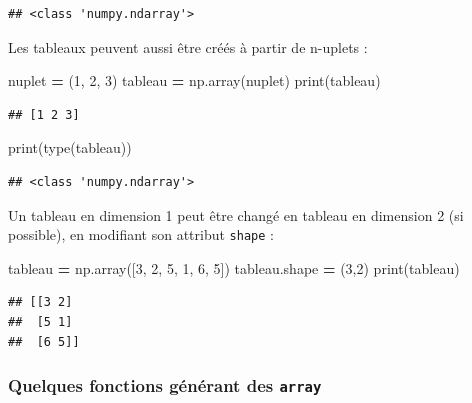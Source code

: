 \documentclass[
  12pt,
]{book}
\newenvironment{Shaded}{\begin{snugshade}}{\end{snugshade}}
\newcommand{\BuiltInTok}[1]{#1}
\newcommand{\DecValTok}[1]{\textcolor[rgb]{0.00,0.00,0.81}{#1}}
\newcommand{\NormalTok}[1]{#1}
\newcommand{\OperatorTok}[1]{\textcolor[rgb]{0.81,0.36,0.00}{\textbf{#1}}}
\numberwithin{equation}{section}
\numberwithin{countremarque}{section}
\begin{document}
\begin{lstlisting}
## <class 'numpy.ndarray'>
\end{lstlisting}

Les tableaux peuvent aussi être créés à partir de n-uplets :

\begin{Shaded}
\begin{Highlighting}[]
\NormalTok{nuplet }\OperatorTok{=}\NormalTok{ (}\DecValTok{1}\NormalTok{, }\DecValTok{2}\NormalTok{, }\DecValTok{3}\NormalTok{)}
\NormalTok{tableau }\OperatorTok{=}\NormalTok{ np.array(nuplet)}
\BuiltInTok{print}\NormalTok{(tableau)}
\end{Highlighting}
\end{Shaded}

\begin{lstlisting}
## [1 2 3]
\end{lstlisting}

\begin{Shaded}
\begin{Highlighting}[]
\BuiltInTok{print}\NormalTok{(}\BuiltInTok{type}\NormalTok{(tableau))}
\end{Highlighting}
\end{Shaded}

\begin{lstlisting}
## <class 'numpy.ndarray'>
\end{lstlisting}

Un tableau en dimension 1 peut être changé en tableau en dimension 2 (si possible), en modifiant son attribut \texttt{shape} :

\begin{Shaded}
\begin{Highlighting}[]
\NormalTok{tableau }\OperatorTok{=}\NormalTok{ np.array([}\DecValTok{3}\NormalTok{, }\DecValTok{2}\NormalTok{, }\DecValTok{5}\NormalTok{, }\DecValTok{1}\NormalTok{, }\DecValTok{6}\NormalTok{, }\DecValTok{5}\NormalTok{])}
\NormalTok{tableau.shape }\OperatorTok{=}\NormalTok{ (}\DecValTok{3}\NormalTok{,}\DecValTok{2}\NormalTok{)}
\BuiltInTok{print}\NormalTok{(tableau)}
\end{Highlighting}
\end{Shaded}

\begin{lstlisting}
## [[3 2]
##  [5 1]
##  [6 5]]
\end{lstlisting}

\subsubsection{\texorpdfstring{Quelques fonctions générant des \texttt{array}}{Quelques fonctions générant des array}}\label{quelques-fonctions-guxe9nuxe9rant-des-array}
\end{document}
